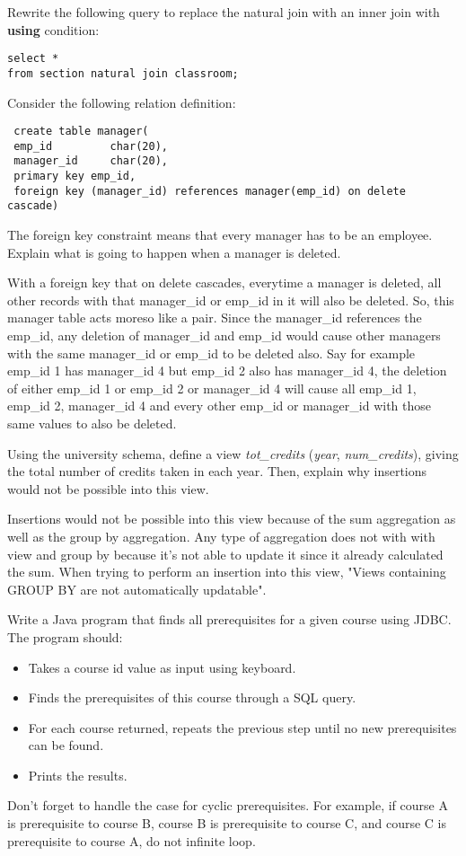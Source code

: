 \documentclass[a4 paper]{article}
\begin{document}
Rewrite the following query to replace the natural join with an inner join with \textbf{using} condition:
\begin{verbatim}
select *
from section natural join classroom;
\end{verbatim}



\color{black}

Consider the following relation definition:
\begin{verbatim}
 create table manager(
 emp_id         char(20),
 manager_id     char(20),
 primary key emp_id,
 foreign key (manager_id) references manager(emp_id) on delete cascade)
\end{verbatim}
The foreign key constraint means that every manager has to be an employee.
Explain what is going to happen when a manager is deleted.

With a foreign key that on delete cascades, everytime a manager is deleted, all other records with that manager\_id or emp\_id in it will also be deleted.
So, this manager table acts moreso like a pair. Since the manager\_id references the emp\_id, any deletion of manager\_id and emp\_id would cause other managers with the same manager\_id or emp\_id to be deleted also.
Say for example emp\_id 1 has manager\_id 4 but emp\_id 2 also has manager\_id 4, the deletion of either emp\_id 1 or emp\_id 2 or manager\_id 4 will cause all emp\_id 1, emp\_id 2, manager\_id 4 and every other emp\_id or manager\_id with those same values to also be deleted.

Using the university schema, define a view \emph{tot\_credits} (\emph{year}, \emph{num\_credits}), giving the total number of credits taken in each year. Then, explain why insertions would not be possible into this view.

Insertions would not be possible into this view because of the sum aggregation as well as the group by aggregation.
Any type of aggregation does not with with view and group by because it's not able to update it since it already calculated the sum.
When trying to perform an insertion into this view, "Views containing GROUP BY are not automatically updatable".


Write a Java program that finds all prerequisites for a given course using JDBC. The program should:
\begin{itemize}
 \item Takes a course id value as input using keyboard.
 \item Finds the prerequisites of this course through a SQL query.
 \item For each course returned, repeats the previous step until no new prerequisites can be found.
 \item Prints the results.
\end{itemize}
Don't forget to handle the case for cyclic prerequisites. For example, if course A is prerequisite to course B, course B is prerequisite to course C, and course C is prerequisite to course A, do not infinite loop.
\end{document}
